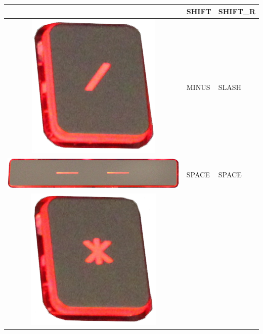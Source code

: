 \begin{longtable}{|cll|}
\begin{minipage}[c]{.3\textwidth}
\vspace{0.2cm}
\end{minipage} & SHIFT & SHIFT\_R\\
\hline
\begin{minipage}[c]{.3\textwidth}
\vspace{0.2cm}
\includegraphics[scale=0.06]{Images/KeyMapping/SLASH}
\vspace{0.2cm}
\end{minipage} & MINUS & SLASH\\
\hline
\begin{minipage}[c]{.3\textwidth}
\vspace{0.2cm}
\includegraphics[scale=0.06]{Images/KeyMapping/SPACE}
\vspace{0.2cm}
\end{minipage} & SPACE & SPACE\\
\hline
\begin{minipage}[c]{.3\textwidth}
\vspace{0.2cm}
\includegraphics[scale=0.06]{Images/KeyMapping/STAR}

\end{minipage}
\end{longtable}
